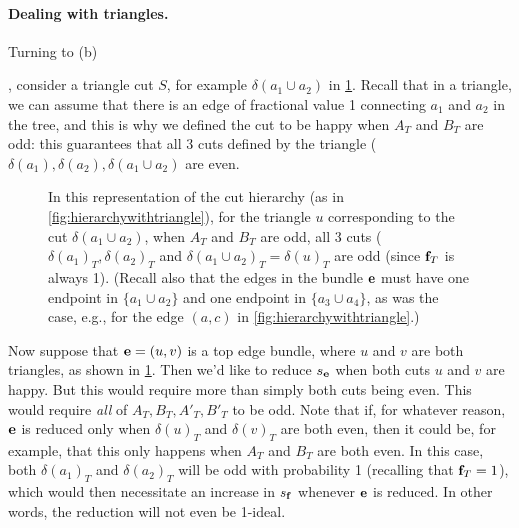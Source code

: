 \paragraph{Dealing with triangles.} \hypertarget{211-explanation}{Turning to (b)}, consider  a triangle cut $S$, for example $\delta(a_1 \cup a_2)$ in \cref{fig:twotriangles}.
Recall that in a triangle, we can assume that there is an edge of fractional value 1 connecting $a_1$ and $a_2$ in the tree, and this is why we defined the cut to be happy when $A_T$ and $B_T$ are odd: this guarantees that all 3 cuts  defined by the triangle ($\delta(a_1),\delta(a_2), \delta(a_1 \cup a_2)$ are even. %

\begin{figure}\centering
{}
\caption{In this representation of the cut hierarchy (as in \cref{fig:hierarchywithtriangle}), for the triangle $u$ corresponding to the cut $\delta(a_1\cup a_2)$, when $A_T$ and $B_T$ are odd, all 3 cuts ($\delta(a_1)_T, \delta(a_2)_T$ and $\delta(a_1 \cup a_2)_T = \delta(u)_T$ are odd (since ${\bf f}_T$ is always 1). (Recall also that the edges in the bundle ${\bf e}$ must have one endpoint in $\{a_1 \cup a_2\}$ and one endpoint in $\{a_3 \cup a_4\}$, as was the case, e.g., for the edge $(a,c)$ in \cref{fig:hierarchywithtriangle}.)}
\label{fig:twotriangles}
\end{figure}
Now suppose that ${\bf e} = (u,v)$ is a top edge bundle, where $u$ and $v$ are both triangles, as shown in \cref{fig:twotriangles}. Then we'd like to reduce $s_{\bf e}$ when both cuts $u$ and $v$ are happy. But this would require more than simply both cuts being even. This would require  {\em all} of 
$A_T, B_T, A'_T, B'_T$ to  be odd. Note that if, for whatever reason,  ${\bf e}$ is reduced only when $\delta(u)_T$ and $\delta(v)_T$ are both even, then it could be, for example, that this only happens when $A_T$ and $B_T$ are both even. In this case, both $\delta(a_1)_T$ and $\delta(a_2)_T$ will be odd with probability 1 (recalling that ${\bf f}_T=1$), which would then necessitate an increase in $s_{\bf f}$ whenever ${\bf e}$ is reduced. In other words, the reduction will not even be 1-ideal.


